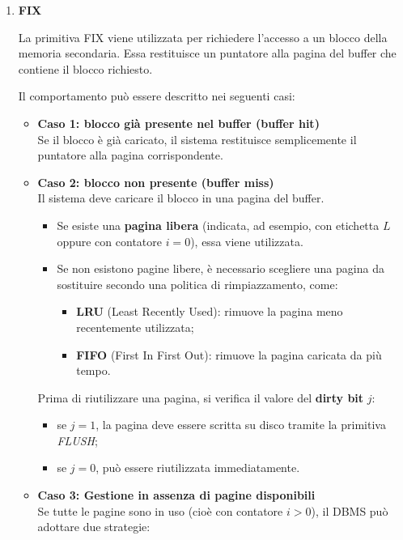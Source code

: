 \begin{enumerate}
	\item \textbf{FIX}
	
	La primitiva FIX viene utilizzata per richiedere l'accesso a un blocco della memoria secondaria. 
	Essa restituisce un puntatore alla pagina del buffer che contiene il blocco richiesto.
	
	Il comportamento può essere descritto nei seguenti casi:
	
	\begin{itemize}
		\item \textbf{Caso 1: blocco già presente nel buffer (buffer hit)} \\
		Se il blocco è già caricato, il sistema restituisce semplicemente il puntatore alla pagina corrispondente.
		
		\item \textbf{Caso 2: blocco non presente (buffer miss)} \\
		Il sistema deve caricare il blocco in una pagina del buffer.
		
		\begin{itemize}
			\item Se esiste una \textbf{pagina libera} (indicata, ad esempio, con etichetta $L$ oppure con contatore $i = 0$), essa viene utilizzata.
			
			\item Se non esistono pagine libere, è necessario scegliere una pagina da sostituire secondo una politica di rimpiazzamento, come:
			\begin{itemize}
				\item \textbf{LRU} (Least Recently Used): rimuove la pagina meno recentemente utilizzata;
				\item \textbf{FIFO} (First In First Out): rimuove la pagina caricata da più tempo.
			\end{itemize}
		\end{itemize}
		
		Prima di riutilizzare una pagina, si verifica il valore del \textbf{dirty bit} $j$:
		\begin{itemize}
			\item se $j = 1$, la pagina deve essere scritta su disco tramite la primitiva \textit{FLUSH};
			\item se $j = 0$, può essere riutilizzata immediatamente.
		\end{itemize}
		
		\item \textbf{Caso 3: Gestione in assenza di pagine disponibili} \\
		Se tutte le pagine sono in uso (cioè con contatore $i > 0$), il DBMS può adottare due strategie:
		

\end{itemize}
\end{enumerate}
